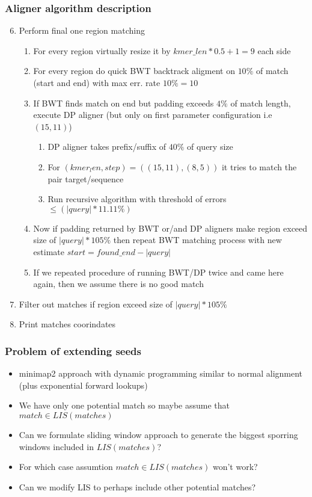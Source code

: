 \documentclass{beamer}
\begin{document}
\begin{frame}
  \frametitle{Aligner algorithm description}
  \scriptsize
  \begin{enumerate}
    \setcounter{enumi}{5}
    \item Perform final one region matching
    \begin{enumerate}
      \scriptsize
      \item For every region virtually resize it by $kmer\_len*0.5+1 = 9$ each side
      \item For every region do quick BWT backtrack aligment on $10\%$ of match (start and end) with max err. rate $10\%=10$
      \item If BWT finds match on end but padding exceeds $4\%$ of match length, execute DP aligner (but only on first parameter configuration i.e $(15, 11)$)
      \begin{enumerate}
        \scriptsize
        \item DP aligner takes prefix/suffix of $40\%$ of query size
        \item For $(kmer_len, step) = ((15, 11), (8, 5))$ it tries to match the pair target/sequence
        \item Run recursive algorithm with threshold of errors $\leq (|query| * 11.11\%)$
      \end{enumerate}
      \item Now if padding returned by BWT or/and DP aligners make region exceed size of $|query|*105\%$ then repeat BWT matching process with new estimate $start = found\_end - |query|$
      \item If we repeated procedure of running BWT/DP twice and came here again, then we assume there is no good match
    \end{enumerate}
    \item Filter out matches if region exceed size of $|query|*105\%$
    \item Print matches coorindates
  \end{enumerate}

\end{frame}

\begin{frame}
  \frametitle{Problem of extending seeds}

  \begin{itemize}
    \item minimap2 approach with dynamic programming similar to normal alignment (plus exponential forward lookups)
    \item We have only one potential match so maybe assume that $match \in LIS(matches)$
    \item Can we formulate sliding window approach to generate the biggest sporring windows included in $LIS(matches)$?
    \item For which case assumtion $match \in LIS(matches)$ won't work?
    \item Can we modify LIS to perhaps include other potential matches?
  \end{itemize}
\end{frame}
\end{document}
